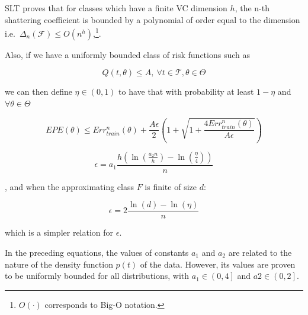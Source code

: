 SLT proves that for classes which have a finite VC dimension $h$, the n-th shattering coefficient is bounded by a polynomial of order equal to the dimension
i.e.\ $\Delta_n(\mathcal {F}) \leq O(n^{h})$,\footnote{$O(\cdot)$ corresponds to Big-O notation.}.


Also, if we have a uniformly bounded class of risk functions such as 

\begin{equation}
Q(t,\theta) \leq A,  \ \forall t \in \mathcal {T}, \theta \in \Theta
\end{equation}

we can then define $\eta \in (0,1)$ to have that with probability at least $1 - \eta$ and $\forall \theta \in \Theta$

\begin{equation}
EPE(\theta) \leq Err^n_{train}(\theta) + \frac{A \epsilon}{2} \left(1 + \sqrt{1 + \frac{4 Err^n_{train}(\theta) }{A \epsilon}} \right)
\end{equation}\label{eq:vapnik-classificationBound}



\begin{equation}
\epsilon = a_1 \frac{h \left( \ln(\frac{a_2 n}{h} ) - \ln(\frac{\eta}{4} ) \right)}{n}
\end{equation}\label{eq:vapnik-epsilonBound}

, and when the approximating class $F$ is finite of size $d$:

\begin{equation}
\epsilon = 2 \frac{ \ln(d) - \ln(\eta)}{n}
\end{equation}\label{eq:vapnik-epsilonBoundSimple}


which is a simpler relation for $\epsilon$.

In the preceding equations, the values of constants $a_1$ and $a_2$ are related to the nature of the density function $p(t)$ of the data.
However, its values are proven to be uniformly bounded for all distributions, with $a_1 \in {\left(0,4 \right] }$ and $a2 \in {\left(0,2 \right]}$.

